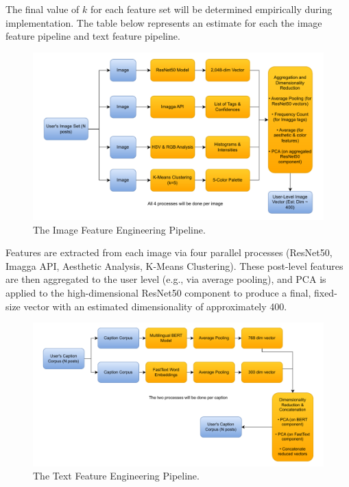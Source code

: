 The final value of $k$ for each feature set will be determined empirically during implementation. The table below represents an estimate for each the image feature pipeline and text feature pipeline.


\begin{figure}[H]
	\centering
	\includegraphics[width=\textwidth]{"figures/Image-Pipeline-Diagram.pdf"}
	\caption{The Image Feature Engineering Pipeline. }
	\label{fig:image_pipeline_diagram}
\end{figure}

Features are extracted from each image via four parallel processes (ResNet50, Imagga API, Aesthetic Analysis, K-Means Clustering). These post-level features are then aggregated to the user level (e.g., via average pooling), and PCA is applied to the high-dimensional ResNet50 component to produce a final, fixed-size vector with an estimated dimensionality of approximately 400.

\begin{figure}[H]
	\centering
	\includegraphics[width=\textwidth]{"figures/Text-Pipeline-Diagram.pdf"}
	\caption{The Text Feature Engineering Pipeline. }
	\label{fig:text_pipeline_diagram}
\end{figure}

